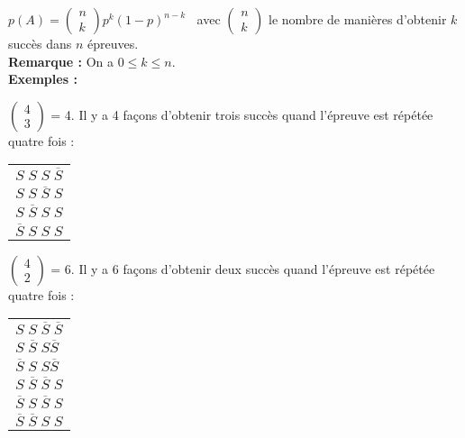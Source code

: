$ p\left(A\right)  = \left(\begin{array}{c} n \\ k \end{array} \right) p^k \left(1-p\right)^{n-k} \; \;  $ avec $\left(\begin{array}{c} n \\ k \end{array} \right)$ le nombre de manières d'obtenir $k$ succès dans $n$ épreuves. \\

\textbf{Remarque :} On a $ 0 \leqslant k \leqslant n $.  \\

\textbf{Exemples :}

$\left(\begin{array}{c} 4 \\ 3 \end{array} \right)$ = 4. Il y a 4 façons d'obtenir trois succès quand l'épreuve est répétée quatre fois : \\

\begin{tabular}{l}
$ S \; S \; S \; \overline{S} $ \\
$ S \; S  \; \overline{S} \; S $ \\
$ S \; \overline{S} \; S \; S $ \\
$ \overline{S} \; S \; S \; S $ \\
\end{tabular}

\vspace{.3cm}

$\left(\begin{array}{c} 4 \\ 2 \end{array} \right)$ = 6. Il y a 6 façons d'obtenir deux succès quand l'épreuve est répétée quatre fois : \\

\begin{tabular}{l}
$ S \; S \; \overline{S} \; \overline{S} $ \\
$ S \; \overline{S} \; S \overline{S} $ \\
$ \overline{S} \; S \; S \overline{S} $ \\
$ S \; \overline{S}  \; \overline{S} \; S $ \\
$ \overline{S} \; S \; \overline{S} \; S $ \\
$ \overline{S} \; \overline{S} \; S \; S $ \\
\end{tabular}


